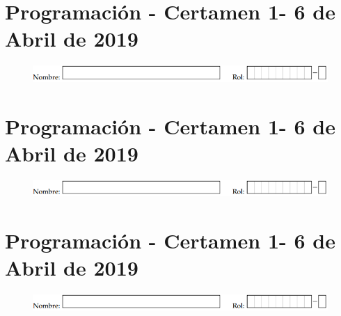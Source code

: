 \documentclass[spanish]{scrartcl}
\newcommand{\numCert}{1}
\newcommand{\annoCert}{2019}
\newcommand{\fechaCert}{6 de Abril de \annoCert}
\begin{document}
\section*{Programación - Certamen \numCert - \fechaCert}
\vspace*{-.6cm}
\begin{figure}[h]
    \centering
    \includegraphics[scale=0.9]{Imagenes/nombrerol.png}
\end{figure}
\vspace*{-1.0cm}

\pagebreak[4]

\section*{Programación - Certamen \numCert - \fechaCert}
\vspace*{-.6cm}
\begin{figure}[h]
    \centering
    \includegraphics[scale=0.9]{Imagenes/nombrerol.png}
\end{figure}
\vspace*{-1.0cm}

\pagebreak[4]

\section*{Programación - Certamen \numCert - \fechaCert}
\vspace*{-.6cm}
\begin{figure}[h]
    \centering
    \includegraphics[scale=0.9]{Imagenes/nombrerol.png}
\end{figure}
\vspace*{-1.0cm}

\end{document}
